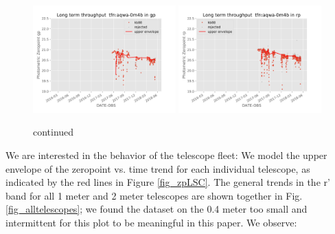 \documentclass[draft]{spieman}
\begin{document}
\begin{figure}
\includegraphics[width=0.49\textwidth]{images/photzptrend-tfn-aqwa-0m4b-gp.png} \hspace*{\fill}
\includegraphics[width=0.49\textwidth]{images/photzptrend-tfn-aqwa-0m4b-rp.png} \\[1ex]
\caption {continued}
\end{figure}


We are interested in the behavior of the telescope fleet: We model the upper
envelope of the zeropoint vs. time trend for each individual telescope, as indicated by the red
lines
in Figure \ref{fig_zpLSC}. The general trends in the r' band for all 1 meter and 2 meter telescopes
are shown together in Fig. \ref{fig_alltelescopes}; we found the dataset on the 0.4 meter too small
and intermittent  for
this plot to be meaningful in this paper. We observe:
\end{document}
